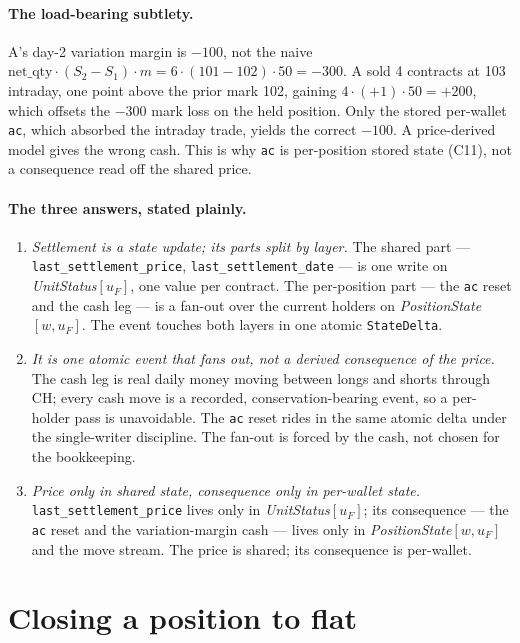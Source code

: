\documentclass[11pt]{article}
\newcommand{\ac}{\texttt{ac}}
\newcommand{\netq}{\mathrm{net\_qty}}
\newcommand{\code}[1]{\texttt{#1}}
\newcommand{\unit}{u_{F}}
\newcommand{\mult}{m}
\begin{document}
\paragraph{The load-bearing subtlety.} A's day-2 variation margin is $-100$, not the naive
$\netq\cdot(S_2-S_1)\cdot\mult = 6\cdot(101-102)\cdot 50 = -300$. A sold 4 contracts at 103
intraday, one point above the prior mark 102, gaining $4\cdot(+1)\cdot 50=+200$, which offsets the
$-300$ mark loss on the held position. Only the stored per-wallet \ac, which absorbed the intraday
trade, yields the correct $-100$. A price-derived model gives the wrong cash. This is why \ac{} is
per-position stored state (C11), not a consequence read off the shared price.

\paragraph{The three answers, stated plainly.}
\begin{enumerate}
\item \emph{Settlement is a state update; its parts split by layer.} The shared part ---
\code{last\_settlement\_price}, \code{last\_settlement\_date} --- is one write on
\emph{UnitStatus}$[\unit]$, one value per contract. The per-position part --- the \ac{} reset and
the cash leg --- is a fan-out over the current holders on \emph{PositionState}$[w,\unit]$. The event
touches both layers in one atomic \code{StateDelta}.
\item \emph{It is one atomic event that fans out, not a derived consequence of the price.} The cash
leg is real daily money moving between longs and shorts through CH; every cash move is a recorded,
conservation-bearing event, so a per-holder pass is unavoidable. The \ac{} reset rides in the same
atomic delta under the single-writer discipline. The fan-out is forced by the cash, not chosen for
the bookkeeping.
\item \emph{Price only in shared state, consequence only in per-wallet state.}
\code{last\_settlement\_price} lives only in \emph{UnitStatus}$[\unit]$; its consequence --- the
\ac{} reset and the variation-margin cash --- lives only in \emph{PositionState}$[w,\unit]$ and the
move stream. The price is shared; its consequence is per-wallet.
\end{enumerate}

\section{Closing a position to flat}
\label{sec:close}
\end{document}
